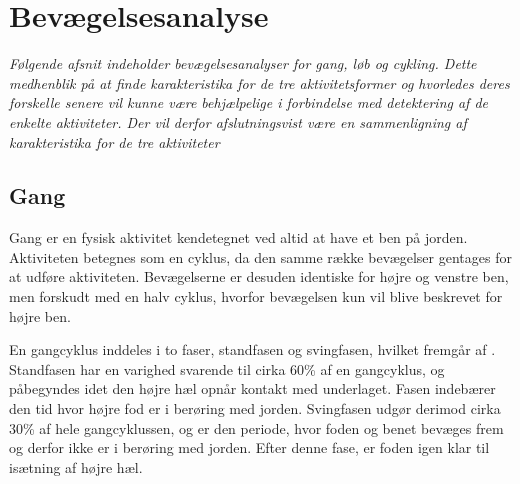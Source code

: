 \section{Bevægelsesanalyse} \label{bevaegelse}
%
\textit{Følgende afsnit indeholder bevægelsesanalyser for gang, løb og cykling. Dette medhenblik på at finde karakteristika for de tre aktivitetsformer og hvorledes deres forskelle senere vil kunne være behjælpelige i forbindelse med detektering af de enkelte aktiviteter. Der vil derfor afslutningsvist være en sammenligning af karakteristika for de tre aktiviteter}

\subsection{Gang}
Gang er en fysisk aktivitet kendetegnet ved altid at have et ben på jorden. Aktiviteten betegnes som en cyklus, da den samme række bevægelser gentages for at udføre aktiviteten. Bevægelserne er desuden identiske for højre og venstre ben, men forskudt med en halv cyklus, hvorfor bevægelsen kun vil blive beskrevet for højre ben. \citep{VaughanDavisOConnor1992,Whittle1990} 

En gangcyklus inddeles i to faser, standfasen og svingfasen, hvilket fremgår af . Standfasen har en varighed svarende til cirka 60\% af en gangcyklus, og påbegyndes idet den højre hæl opnår kontakt med underlaget. Fasen indebærer den tid hvor højre fod er i berøring med jorden. Svingfasen udgør derimod cirka 30\% af hele gangcyklussen, og er den periode, hvor foden og benet bevæges frem og derfor ikke er i berøring med jorden. Efter denne fase, er foden igen klar til isætning af højre hæl. \citep{VaughanDavisOConnor1992}

